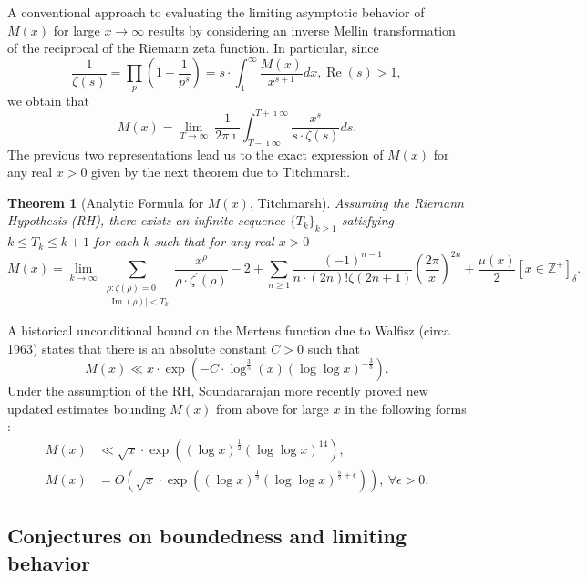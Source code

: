\documentclass[11pt,reqno,a4letter]{article}
\numberwithin{figure}{section}
\numberwithin{table}{section}
\newcommand{\Iverson}[1]{\ensuremath{\left[#1\right]_{\delta}}}
\theoremstyle{plain}
\newtheorem{theorem}{Theorem}
\numberwithin{theorem}{section}
\theoremstyle{definition}
\renewcommand{\Re}{\operatorname{Re}}
\renewcommand{\Im}{\operatorname{Im}}
\begin{document}
A conventional approach to evaluating the limiting asymptotic 
behavior of $M(x)$ for large $x \rightarrow \infty$ results by considering an 
inverse Mellin transformation of the reciprocal of the Riemann zeta function. 
In particular, since 
\[
\frac{1}{\zeta(s)} = \prod_{p} \left(1 - \frac{1}{p^s}\right) = 
     s \cdot \int_1^{\infty} \frac{M(x)}{x^{s+1}} dx, \Re(s) > 1, 
\]
we obtain that 
\[
M(x) = \lim_{T \rightarrow \infty}\ \frac{1}{2\pi\imath} \int_{T-\imath\infty}^{T+\imath\infty} 
     \frac{x^s}{s \cdot \zeta(s)} ds. 
\] 
The previous two representations lead us to the 
exact expression of $M(x)$ for any real $x > 0$ 
given by the next theorem due to Titchmarsh. 
\nocite{TITCHMARSH} 

\begin{theorem}[Analytic Formula for $M(x)$, Titchmarsh] 
\label{theorem_MxMellinTransformInvFormula} 
Assuming the Riemann Hypothesis (RH), there exists an infinite sequence 
$\{T_k\}_{k \geq 1}$ satisfying $k \leq T_k \leq k+1$ for each $k$ 
such that for any real $x > 0$ 
\[
M(x) = \lim_{k \rightarrow \infty} 
     \sum_{\substack{\rho: \zeta(\rho) = 0 \\ |\Im(\rho)| < T_k}} 
     \frac{x^{\rho}}{\rho \cdot \zeta^{\prime}(\rho)} - 2 + 
     \sum_{n \geq 1} \frac{(-1)^{n-1}}{n \cdot (2n)! \zeta(2n+1)} 
     \left(\frac{2\pi}{x}\right)^{2n} + 
     \frac{\mu(x)}{2} \Iverson{x \in \mathbb{Z}^{+}}. 
\] 
\end{theorem} 

A historical unconditional bound on the Mertens function due to Walfisz (circa 1963) 
states that there is an absolute constant $C > 0$ such that 
$$M(x) \ll x \cdot \exp\left(-C \cdot \log^{\frac{3}{5}}(x) 
  (\log\log x)^{-\frac{3}{5}}\right).$$ 
Under the assumption of the RH, Soundararajan more recently proved new updated estimates 
bounding $M(x)$ from above for large $x$ in the following forms \cite{SOUND-MERTENS-ANNALS}: 
\begin{align*} 
M(x) & \ll \sqrt{x} \cdot \exp\left((\log x)^{\frac{1}{2}} (\log\log x)^{14}\right), \\ 
M(x) & = O\left(\sqrt{x} \cdot \exp\left( 
     (\log x)^{\frac{1}{2}} (\log\log x)^{\frac{5}{2}+\epsilon}\right)\right),\ 
     \forall \epsilon > 0. 
\end{align*} 

\subsection{Conjectures on boundedness and limiting behavior} 
\end{document}
